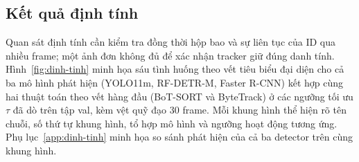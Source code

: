 \documentclass[fontsize=13pt,a4paper,oneside,parskip=false,numbers=noenddot,bibliography=totoc]{scrreprt}
\begin{document}
\subsection{Kết quả định tính}
Quan sát định tính cần kiểm tra đồng thời hộp bao và sự liên tục của ID qua nhiều frame; một ảnh đơn không đủ để xác nhận tracker giữ đúng danh tính. Hình~\ref{fig:dinh-tinh} minh họa sáu tình huống theo vết tiêu biểu đại diện cho cả ba mô hình phát hiện (YOLO11m, RF-DETR-M, Faster R-CNN) kết hợp cùng hai thuật toán theo vết hàng đầu (BoT-SORT và ByteTrack) ở các ngưỡng tối ưu $\tau$ đã dò trên tập val, kèm vệt quỹ đạo 30 frame. Mỗi khung hình thể hiện rõ tên chuỗi, số thứ tự khung hình, tổ hợp mô hình và ngưỡng hoạt động tương ứng. Phụ lục~\ref{app:dinh-tinh} minh họa so sánh phát hiện của cả ba detector trên cùng khung hình.
\end{document}

